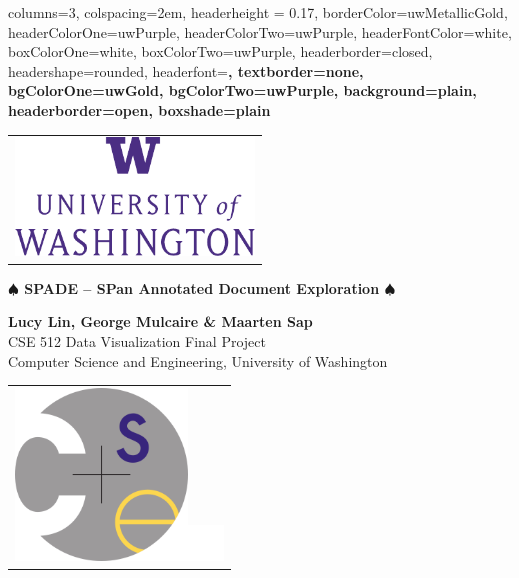 \documentclass[paperwidth=118cm,paperheight=84cm,portrait,margin=8em,fontscale=0.3]{baposter}
\begin{document}

\background{
}

\begin{poster}{
	columns=3,
	colspacing=2em,
	headerheight = 0.17\textheight ,
	borderColor=uwMetallicGold,
	headerColorOne=uwPurple,
	headerColorTwo=uwPurple,
	headerFontColor=white,
	boxColorOne=white,
	boxColorTwo=uwPurple,
	headerborder=closed,
	headershape=rounded,
	headerfont=\Large\sf\bf,
	textborder=none,
	bgColorOne=uwGold,
	bgColorTwo=uwPurple,
	background=plain,
	headerborder=open,
	boxshade=plain
}
{
{
	\begin{tabular}{l}
			\includegraphics[width=2.5in]{graphics/UWlogo.pdf} \\
	\end{tabular}
}
}
{ %
\textbf{$\spadesuit$ SPADE -- SPan Annotated Document Exploration $\spadesuit$}
}
{
\vspace*{0.8em}
\textbf{Lucy Lin, George Mulcaire \& Maarten Sap}\\

CSE 512 Data Visualization Final Project\\
Computer Science and Engineering, University of Washington

 \vspace*{6pt}
}
{
	\begin{tabular}{r}
			\includegraphics[width=1.80in]{graphics/CSElogo.png}\includegraphics[scale=.7]{graphics/pnt5in.png}
	\end{tabular}
}



\end{poster}
\end{document}

